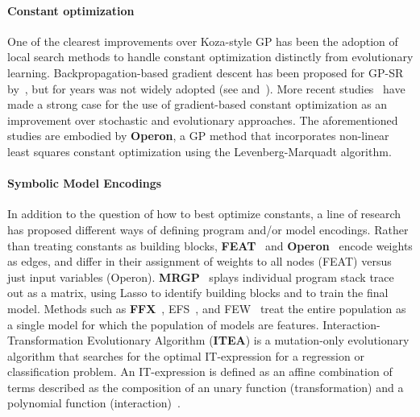 \paragraph{Constant optimization}

One of the clearest improvements over Koza-style GP has been the adoption of local search methods to handle constant optimization distinctly from evolutionary learning. 
Backpropagation-based gradient descent has been proposed for GP-SR by~\citet{topchyFasterGeneticProgramming2001}, but for years was not widely adopted (see \citet{bongardNonlinearSystemIdentification2005a} and~\citet{schmidtDistillingFreeformNatural2009}).
More recent studies~\cite{kommendaEffectsConstantOptimization06,kommendaParameterIdentificationSymbolic2019} have made a strong case for the use %
of gradient-based constant optimization as an improvement over stochastic and evolutionary approaches.
The aforementioned studies are embodied by \textbf{Operon}, a GP method that incorporates non-linear least squares constant optimization using the Levenberg-Marquadt algorithm\cite{burlacuOperonEfficientGenetic2020}.

\paragraph{Symbolic Model Encodings}

In addition to the question of how to best optimize constants, a line of research has proposed different ways of defining program and/or model encodings. 
Rather than treating constants as building blocks, \textbf{FEAT}~\cite{lacavaLearningConciseRepresentations2019c} and \textbf{Operon}~\cite{burlacuOperonEfficientGenetic2020} encode weights as edges, and differ in their assignment of weights to all nodes (FEAT) versus just input variables (Operon). 
\textbf{MRGP}~\cite{arnaldoMultipleRegressionGenetic2014a} splays individual program stack trace out as a matrix, using Lasso to identify building blocks and to train the final model.
Methods such as \textbf{FFX}~\cite{mcconaghyFFXFastScalable2011}, EFS~\cite{arnaldoBuildingPredictiveModels2015}, and FEW~\cite{lacavaGeneralFeatureEngineering2017} treat the entire population as a single model for which the population of models are features.
Interaction-Transformation Evolutionary Algorithm (\textbf{ITEA}) is a mutation-only evolutionary algorithm that searches for the optimal IT-expression for a regression or classification problem.
An IT-expression is defined as an affine combination of terms described as the composition of an unary function (transformation) and a polynomial function (interaction)~\cite{de_franca_greedy_2018,defrancaInteractionTransformationEvolutionaryAlgorithm2020}.


